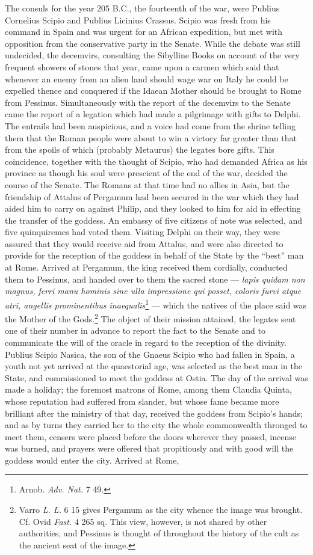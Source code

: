 \documentclass[a4paper, 11pt, oneside, polutonikogreek, english]{article}
\begin{document}
The consuls for the year 205 \textsc{B.C.}, the fourteenth of the war, were Publius Cornelius Scipio and Publius Licinius Crassus. Scipio was fresh from his command in Spain and was urgent for an African expedition, but met with opposition from the conservative party in the Senate. While the debate was still undecided, the decemvirs, consulting the Sibylline Books on account of the very frequent showers of stones that year, came upon a carmen which said that whenever an enemy from an alien land should wage war on Italy he could be expelled thence and conquered if the Idaean Mother should be brought to Rome from Pessinus. Simultaneously with the report of the decemvirs to the Senate came the report of a legation which had made a pilgrimage with gifts to Delphi. The entrails had been auspicious, and a voice had come from the shrine telling them that the Roman people were about to win a victory far greater than that from the spoils of which (probably Metaurus) the legates bore gifts. This coincidence, together with the thought of Scipio, who had demanded Africa as his province as though his soul were prescient of the end of the war, decided the course of the Senate. The Romans at that time had no allies in Asia, but the friendship of Attalus of Pergamum had been secured in the war which they had aided him to carry on against Philip, and they looked to him for aid in effecting the transfer of the goddess. An embassy of five citizens of note was selected, and five quinquiremes had voted them. Visiting Delphi on their way, they were assured that they would receive aid from Attalus, and were also directed to provide for the reception of the goddess in behalf of the State by the ``best'' man at Rome. Arrived at Pergamum, the king received them cordially, conducted them to Pessinus, and handed over to them the sacred stone --- \emph{lapis quidam non magnus, ferri manu hominis sine ulla impressione qui posset, coloris furvi atque atri, angellis prominentibus inaequalis}\footnote{Arnob. \emph{Adv. Nat.} 7 49.} --- which the natives of the place said was the Mother of the Gods.\footnote{Varro \emph{L. L.} 6 15 gives Pergamum as the city whence the image was brought. Cf. Ovid \emph{Fast.} 4 265 sq. This view, however, is not shared by other authorities, and Pessinus is thought of throughout the history of the cult as the ancient seat of the image.} The object of their mission attained, the legates sent one of their number in advance to report the fact to the Senate and to communicate the will of the oracle in regard to the reception of the divinity. Publius Scipio Nasica, the son of the Gnaeus Scipio who had fallen in Spain, a youth not yet arrived at the quaestorial age, was selected as the best man in the State, and commissioned to meet the goddess at Ostia. The day of the arrival was made a holiday; the foremost matrons of Rome, among them Claudia Quinta, whose reputation had suffered from slander, but whose fame became more brilliant after the ministry of that day, received the goddess from Scipio's hands; and as by turns they carried her to the city the whole commonwealth thronged to meet them, censers were placed before the doors wherever they passed, incense was burned, and prayers were offered that propitiously and with good will the goddess would enter the city. Arrived at Rome, 
\end{document}
